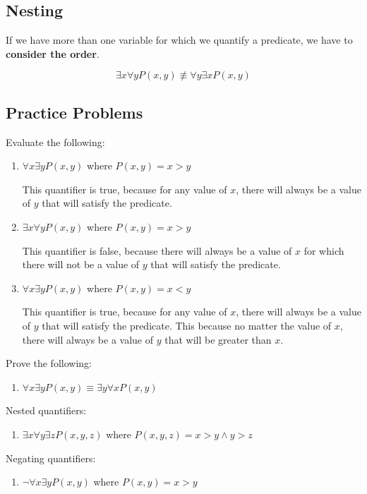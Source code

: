 \documentclass[11pt]{article}
\begin{document}
\subsection{Nesting}
\label{sec:org01dface}
If we have more than one variable for which we quantify a predicate, we have to \textbf{consider the order}.

\[
\exists x \forall y P(x,y) \not \equiv \forall y \exists x P(x,y)
\]

\subsection{Practice Problems}
\label{sec:orgd3e4854}
Evaluate the following:
\begin{enumerate}
\item \(\forall x \exists y P(x,y)\) where \(P(x,y) = x > y\)

This quantifier is true, because for any value of \(x\), there will always be a value of \(y\) that will satisfy the predicate.
\item \(\exists x \forall y P(x,y)\) where \(P(x,y) = x > y\)

This quantifier is false, because there will always be a value of \(x\) for which there will not be a value of \(y\) that will satisfy the predicate.
\item \(\forall x \exists y P(x,y)\) where \(P(x,y) = x < y\)

This quantifier is true, because for any value of \(x\), there will always be a value of \(y\) that will satisfy the predicate. This because no matter the value of \(x\), there will always be a value of \(y\) that will be greater than \(x\).
\end{enumerate}

Prove the following:
\begin{enumerate}
\item \(\forall x \exists y P(x,y) \equiv \exists y \forall x P(x,y)\)
\end{enumerate}

Nested quantifiers:
\begin{enumerate}
\item \(\exists x \forall y \exists z P(x,y,z)\) where \(P(x,y,z) = x > y \land y > z\)
\end{enumerate}

Negating quantifiers:
\begin{enumerate}
\item \(\neg \forall x \exists y P(x,y)\) where \(P(x,y) = x > y\)
\end{enumerate}
\end{document}

